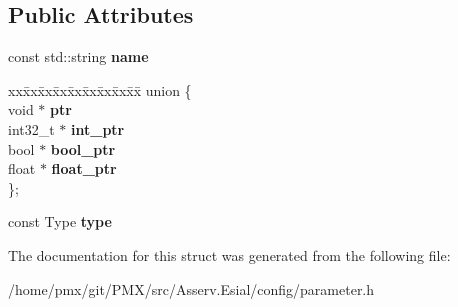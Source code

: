 \subsection*{Public Attributes}
\begin{DoxyCompactItemize}
\item 
\mbox{\label{structParameter_ae8b833b543d3e51c2fbde7bb51a5ec37}} 
const std\+::string {\bfseries name}
\item 
\mbox{\label{structParameter_a03a37ee5cd69c66a8a611014c85e82c4}} 
\begin{tabbing}
xx\=xx\=xx\=xx\=xx\=xx\=xx\=xx\=xx\=\kill
union \{\\
\>void $\ast$ {\bfseries ptr}\\
\>int32\_t $\ast$ {\bfseries int\_ptr}\\
\>bool $\ast$ {\bfseries bool\_ptr}\\
\>float $\ast$ {\bfseries float\_ptr}\\
\}; \\

\end{tabbing}\item 
\mbox{\label{structParameter_a4cf1aee829f88b530bef0ba50413724a}} 
const Type {\bfseries type}
\end{DoxyCompactItemize}


The documentation for this struct was generated from the following file\+:\begin{DoxyCompactItemize}
\item 
/home/pmx/git/\+P\+M\+X/src/\+Asserv.\+Esial/config/parameter.\+h\end{DoxyCompactItemize}

